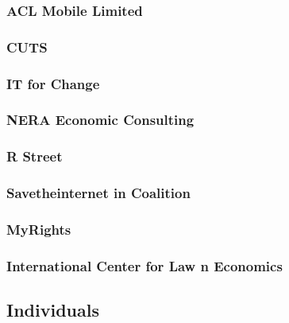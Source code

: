 \documentclass{article}
\begin{document}
\subsubsection{ACL Mobile Limited}


\subsubsection{CUTS}


\subsubsection{IT for Change}


\subsubsection{NERA Economic Consulting}


\subsubsection{R Street}


\subsubsection{Savetheinternet in Coalition}


\subsubsection{MyRights}


\subsubsection{International Center for Law n Economics}




\subsection{Individuals}
\end{document}
